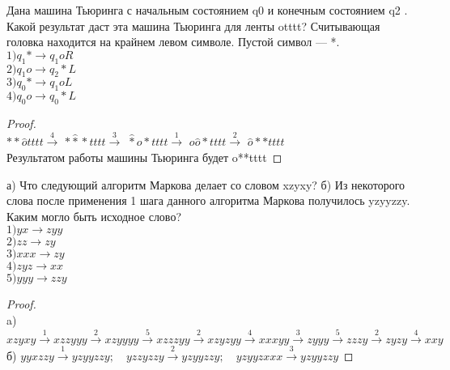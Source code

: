 \begin{problem}
Дана машина Тьюринга с начальным состоянием q0 и
конечным состоянием q2 . Какой результат даст эта машина Тьюринга для ленты otttt? Считывающая головка находится на крайнем левом символе. Пустой символ — *.\\
$1) q_1* \to q_1oR$\\
$2) q_1o \to q_2 * L$\\
$3) q_0* \to q_1oL$\\
$4) q_0o \to q_0*L$
\end{problem}
\begin{proof} $ $\\
$**\hat{o}tttt \xrightarrow{4}$
$*\hat{*}*tttt \xrightarrow{3}$
$\hat{*}o*tttt \xrightarrow{1}$
$o\hat{o}*tttt \xrightarrow{2}$
$\hat{o}**tttt$\\
Результатом работы машины Тьюринга будет o**tttt
\end{proof}


\begin{problem}
а) Что следующий алгоритм Маркова делает со словом
xzyxy?
б) Из некоторого слова после применения 1 шага данного алгоритма Маркова получилось yzyyzzy. Каким могло быть исходное слово?\\
$1) yx \to zyy$\\
$2) zz \to zy$\\
$3) xxx \to zy$\\
$4) zyz \to xx$\\
$5) yyy \to zzy$
\end{problem}
\begin{proof} $ $\\
a) $xzyxy \xrightarrow{1} xzzyyy \xrightarrow{2} xzyyyy \xrightarrow{5} xzzzyy \xrightarrow{2} xzyzyy \xrightarrow{4} xxxyy \xrightarrow{3} zyyy \xrightarrow{5} zzzy \xrightarrow{2} zyzy \xrightarrow{4} xxy$\\
б) $yyxzzy \xrightarrow{1} yzyyzzy; \quad yzzyzzy \xrightarrow{2} yzyyzzy; \quad yzyyzxxx \xrightarrow{3} yzyyzzy$
\end{proof}

